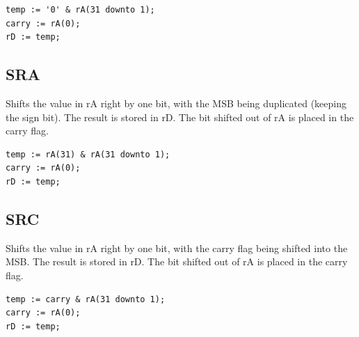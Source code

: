 \documentclass{UoYCSproject}
\begin{document}
\begin{lstlisting}
temp := '0' & rA(31 downto 1);
carry := rA(0);
rD := temp;
\end{lstlisting}

\subsection{SRA}

Shifts the value in rA right by one bit, with the MSB being duplicated (keeping the sign bit). The result is stored in rD.
The bit shifted out of rA is placed in the carry flag.

\begin{lstlisting}
temp := rA(31) & rA(31 downto 1);
carry := rA(0);
rD := temp;
\end{lstlisting}

\subsection{SRC}

Shifts the value in rA right by one bit, with the carry flag being shifted into the MSB. The result is stored in rD.
The bit shifted out of rA is placed in the carry flag.

\begin{lstlisting}
temp := carry & rA(31 downto 1);
carry := rA(0);
rD := temp;
\end{lstlisting}

\printbibliography
\end{document}
